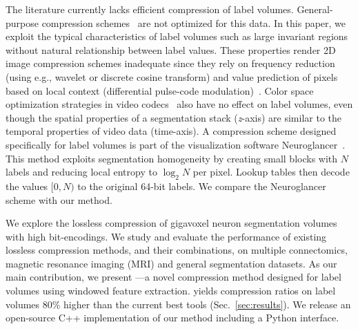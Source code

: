 The literature currently lacks efficient compression of label volumes. 
General-purpose compression schemes~\cite{deutsch1996zlib,ziv1978compression,lehmann2016liblzf,oberhumer2005lzo,welch1984technique,seward1998bzip2,pavlov2007lzma,vandevenne2016zopfli,google2016brotli,collet2016smaller} are not optimized for this data.
In this paper, we exploit the typical characteristics of label volumes such as large invariant regions without natural relationship between label values. 
These properties render 2D image compression schemes inadequate since they rely on frequency reduction (using e.g., wavelet or discrete cosine transform) and value prediction of pixels based on local context (differential pulse-code modulation)~\cite{roelofs1999png,skodras2001jpeg}. 
Color space optimization strategies in video codecs~\cite{aimar2005x264} also have no effect on label volumes, even though the spatial properties of a segmentation stack (\textit{z}-axis) are similar to the temporal properties of video data (time-axis). 
A compression scheme designed specifically for label volumes is part of the visualization software Neuroglancer~\cite{google2016compressed}. 
This method exploits segmentation homogeneity by creating small blocks with $N$ labels and reducing local entropy to $\log_2{N}$ per pixel. 
Lookup tables then decode the values $[0,N)$ to the original 64-bit labels. We compare the Neuroglancer scheme with our method.
%
%
%
%
%

We explore the lossless compression of gigavoxel neuron segmentation volumes with high bit-encodings. 
We study and evaluate the performance of existing lossless compression methods, and their combinations, on multiple connectomics, magnetic resonance imaging (MRI) and general segmentation datasets.
As our main contribution, we present \appName---a novel compression method designed for label volumes using windowed feature extraction. 
\appName yields compression ratios on label volumes 80\% higher than the current best tools (Sec.~\ref{sec:results}).
We release an open-source C++ implementation of our method including a Python interface.
